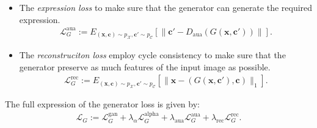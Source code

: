 \documentclass[10pt]{article}
\newcommand{\ve}[1]{\pmb{#1}}
\newcommand{\mc}[1]{\mathcal{#1}}
\newcommand{\mrm}[1]{\mathrm{#1}}
\begin{document}
\begin{itemize}
\begin{itemize}
      \item The \emph{expression loss} to make sure that the generator can generate the required expression.
      \begin{align*}
        \mc{L}^{\mrm{aua}}_G
        :=
        E_{(\ve{x}, \ve{c}) \sim p_{\mc{X}}, \ve{c}' \sim p_{\mc{C}}} [\| \ve{c}' - D_{\mrm{aua}}(G(\ve{x}, \ve{c}')) \|].
      \end{align*}

      \item The \emph{reconstruciton loss} employ cycle consistency to make sure that the generator preserve as much features of the input image as possible.
      \begin{align*}
        \mc{L}^{\mrm{rec}}_G
        := 
        E_{(\ve{x}, \ve{c}) \sim p_{\mc{X}}, \ve{c}' \sim p_{\mc{C}}} [\| \ve{x} - (G(\ve{x}, \ve{c}'), \ve{c}) \|_1].
      \end{align*}      
    \end{itemize}
    The full expression of the generator loss is given by:
    \begin{align*}
      \mc{L}_G 
      :=
      \mc{L}^{\mrm{gan}}_G + \lambda_{\alpha} \mc{L}^{\mrm{alpha}}_G + \lambda_{\mrm{aua}} \mc{L}^{\mrm{aua}}_G + \lambda_{\mrm{rec}} \mc{L}^{\mrm{rec}}_G.
    \end{align*}
  \end{itemize}

  
    
\end{document}
